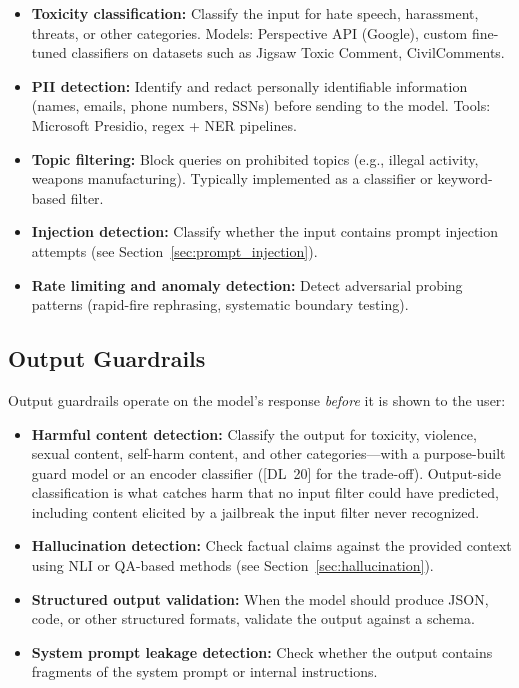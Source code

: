 \begin{itemize}
    \item \textbf{Toxicity classification:} Classify the input for hate speech,
    harassment, threats, or other categories.  Models: Perspective API
    (Google), custom fine-tuned classifiers on datasets such as Jigsaw Toxic
    Comment, CivilComments.
    \item \textbf{PII detection:} Identify and redact personally identifiable
    information (names, emails, phone numbers, SSNs) before sending to the model.
    Tools: Microsoft Presidio, regex + NER pipelines.
    \item \textbf{Topic filtering:} Block queries on prohibited topics (e.g.,
    illegal activity, weapons manufacturing).  Typically implemented as a
    classifier or keyword-based filter.
    \item \textbf{Injection detection:} Classify whether the input contains
    prompt injection attempts (see Section~\ref{sec:prompt_injection}).
    \item \textbf{Rate limiting and anomaly detection:} Detect adversarial
    probing patterns (rapid-fire rephrasing, systematic boundary testing).
\end{itemize}

\subsection{Output Guardrails}

Output guardrails operate on the model's response \emph{before} it is shown to
the user:

\begin{itemize}
    \item \textbf{Harmful content detection:} Classify the output for toxicity,
    violence, sexual content, self-harm content, and other categories---with a
    purpose-built guard model or an encoder classifier ([DL~20] for the
    trade-off).  Output-side classification is what catches harm that no input
    filter could have predicted, including content elicited by a jailbreak the
    input filter never recognized.
    \item \textbf{Hallucination detection:} Check factual claims against the
    provided context using NLI or QA-based methods (see
    Section~\ref{sec:hallucination}).
    \item \textbf{Structured output validation:} When the model should produce
    JSON, code, or other structured formats, validate the output against a
    schema.
    \item \textbf{System prompt leakage detection:} Check whether the output
    contains fragments of the system prompt or internal instructions.
\end{itemize}

